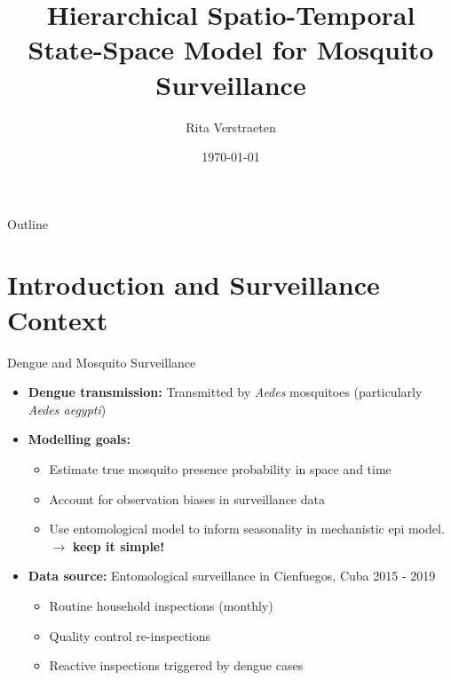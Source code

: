\documentclass[aspectratio=169]{beamer}
\title{Hierarchical Spatio-Temporal State-Space Model for Mosquito Surveillance}
\author{Rita Verstraeten}
\date{\today}
\begin{document}
\titleframe


\begin{frame}{Outline}
  \tableofcontents
\end{frame}


\section{Introduction and Surveillance Context}

\begin{frame}{Dengue and Mosquito Surveillance}
  \begin{itemize}
    \item \textbf{Dengue transmission:} Transmitted by \textit{Aedes} mosquitoes (particularly \textit{Aedes aegypti})
    \item \textbf{Modelling goals:}
      \begin{itemize}
        \item Estimate true mosquito presence probability in space and time
        \item Account for observation biases in surveillance data
        \item Use entomological model to inform seasonality in mechanistic epi model. $\rightarrow$ \textbf{keep it simple!}
      \end{itemize}
    \item \textbf{Data source:} Entomological surveillance in Cienfuegos, Cuba 2015 - 2019
      \begin{itemize}
        \item Routine household inspections (monthly)
        \item Quality control re-inspections
        \item Reactive inspections triggered by dengue cases
      \end{itemize}
  \end{itemize}
\end{frame}
\end{document}
